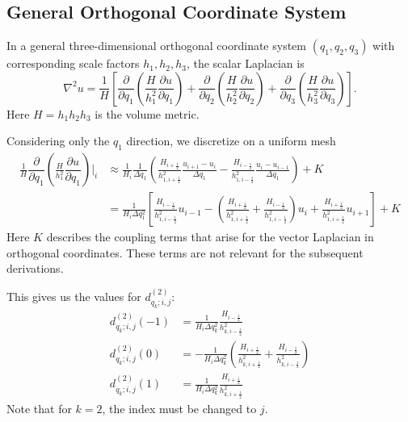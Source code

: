 \documentclass{article}
\numberwithin{equation}{section}
\newcommand{\pd}[2]{\dfrac{\partial #1}{\partial #2}}
\begin{document}
\subsection{General Orthogonal Coordinate System}

In a general three-dimensional orthogonal coordinate system $(q_1, q_2, q_3)$ with corresponding scale factors $h_1, h_2, h_3$,
the scalar Laplacian is
\begin{equation}
    \nabla^2 u = \frac{1}{H} \left[
        \pd{}{q_1} \left(\frac{H}{h_1^2} \pd{u}{q_1}\right)
        + \pd{}{q_2} \left(\frac{H}{h_2^2} \pd{u}{q_2}\right)
        + \pd{}{q_3} \left(\frac{H}{h_3^2} \pd{u}{q_3}\right)
    \right].
\end{equation}
Here $H = h_1 h_2 h_3$ is the volume metric.

Considering only the $q_1$ direction, we discretize on a uniform mesh
\begin{equation}
    \begin{split}
        \frac{1}{H} \pd{}{q_1} \left(\frac{H}{h_1^2} \pd{u}{q_1}\right)\bigg\vert_{i} &\approx
        \frac{1}{H_{i}} \frac{1}{\Delta q_1} \left(
            \frac{H_{i+\tfrac12}}{h_{1, i+\tfrac12}^2} \frac{u_{i+1} - u_{i}}{\Delta q_1}
            - \frac{H_{i-\tfrac12}}{h_{1, i-\tfrac12}^2} \frac{u_{i} - u_{i-1}}{\Delta q_1}
        \right) + K \\
        &= \frac{1}{H_i \Delta q_1^2} \left[
            \frac{H_{i-\tfrac12}}{h_{1,i-\tfrac12}^2} u_{i-1} -
            \left(
                \frac{H_{i+\tfrac12}}{h_{1,i+\tfrac12}^2} +
                \frac{H_{i-\tfrac12}}{h_{1,i-\tfrac12}^2}
            \right) u_{i} +
            \frac{H_{i+\tfrac12}}{h_{1,i+\tfrac12}^2} u_{i+1}
        \right] + K
    \end{split}
\end{equation}
Here $K$ describes the coupling terms that arise for the vector Laplacian in orthogonal coordinates.
These terms are not relevant for the subsequent derivations.

This gives us the values for $d^{(2)}_{q_k;i,j}$:
\begin{equation}
    \begin{split}
        d^{(2)}_{q_k;i,j}(-1) &= \frac{1}{H_i \Delta q_k^2} \frac{H_{i-\tfrac12}}{h_{k,i-\tfrac12}^2} \\
        d^{(2)}_{q_k;i,j}(0)  &= -\frac{1}{H_i \Delta q_k^2} \left(
                \frac{H_{i+\tfrac12}}{h_{k,i+\tfrac12}^2} +
                \frac{H_{i-\tfrac12}}{h_{k,i-\tfrac12}^2}
            \right) \\
        d^{(2)}_{q_k;i,j}(1)  &= \frac{1}{H_i \Delta q_k^2} \frac{H_{i+\tfrac12}}{h_{k,i+\tfrac12}^2}
    \end{split}
\end{equation}
Note that for $k=2$, the index must be changed to $j$.
\end{document}
